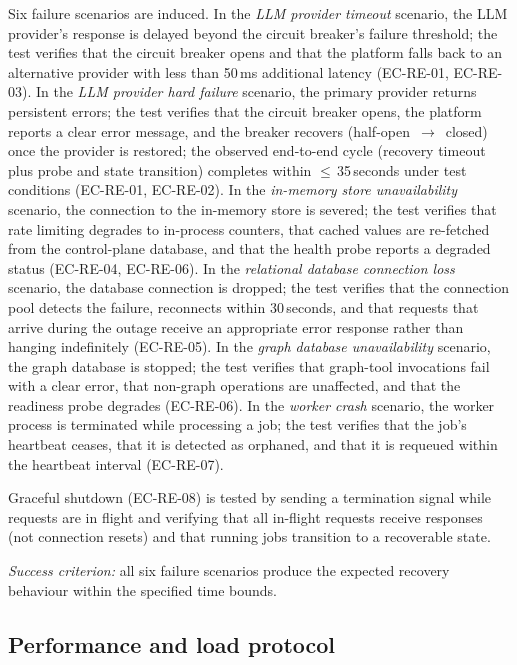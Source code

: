 \documentclass[a4paper,noexaminfo]{sapthesis}
\begin{document}
Six failure scenarios are induced.  In the \emph{LLM provider timeout}
scenario, the LLM provider's response is delayed beyond the circuit
breaker's failure threshold; the test verifies that the circuit breaker
opens and that the platform falls back to an alternative provider with
less than 50\,ms additional latency (EC-RE-01, EC-RE-03).  In the
\emph{LLM provider hard failure} scenario, the primary provider returns
persistent errors; the test verifies that the circuit breaker opens, the
platform reports a clear error message, and the breaker recovers
(half-open~$\to$~closed) once the provider is restored; the observed
end-to-end cycle (recovery timeout plus probe and state transition)
completes within $\leq$\,35\,seconds under test conditions
(EC-RE-01, EC-RE-02).  In the \emph{in-memory store
unavailability} scenario, the connection to the in-memory store is
severed; the test verifies that rate limiting degrades to in-process
counters, that cached values are re-fetched from the control-plane
database, and that the health probe reports a degraded status (EC-RE-04,
EC-RE-06).  In the \emph{relational database connection loss} scenario,
the database connection is dropped; the test verifies that the connection
pool detects the failure, reconnects within 30\,seconds, and that
requests that arrive during the outage receive an appropriate error
response rather than hanging indefinitely (EC-RE-05).  In the
\emph{graph database unavailability} scenario, the graph database is
stopped; the test verifies that graph-tool invocations fail with a clear
error, that non-graph operations are unaffected, and that the readiness
probe degrades (EC-RE-06).  In the \emph{worker crash} scenario, the
worker process is terminated while processing a job; the test verifies
that the job's heartbeat ceases, that it is detected as orphaned, and
that it is requeued within the heartbeat interval (EC-RE-07).

Graceful shutdown (EC-RE-08) is tested by sending a termination signal
while requests are in flight and verifying that all in-flight requests
receive responses (not connection resets) and that running jobs transition
to a recoverable state.

\medskip
\noindent\emph{Success criterion:} all six failure scenarios produce the
expected recovery behaviour within the specified time bounds.

\subsection{Performance and load protocol}
\label{sec:performance-protocol}
\end{document}
